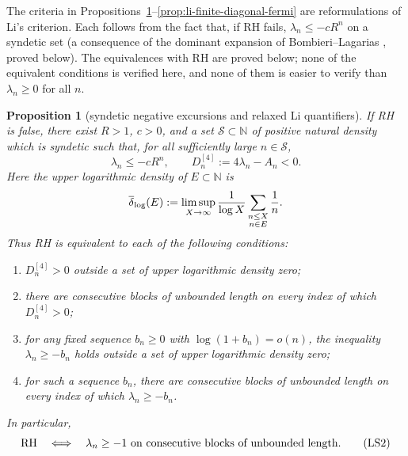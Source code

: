 \documentclass[11pt]{amsart}
\newtheorem{proposition}[theorem]{Proposition}
\theoremstyle{definition}
\theoremstyle{remark}
\theoremstyle{definition}
\newcommand{\RH}{\mathrm{RH}}
\begin{document}
The criteria in Propositions~\ref{prop:li-syndetic-density-criteria}--\ref{prop:li-finite-diagonal-fermi}
are reformulations of Li's criterion.  Each follows from the fact that, if
RH fails, $\lambda_n\le-cR^n$ on a syndetic set (a consequence of the
dominant expansion of Bombieri--Lagarias \cite{BombieriLagarias1999},
proved below).  The equivalences with RH are proved below; none of the
equivalent conditions is verified here, and none of them is easier to
verify than $\lambda_n\ge0$ for all $n$.

\begin{proposition}[syndetic negative excursions and relaxed Li quantifiers]
\label{prop:li-syndetic-density-criteria}
If RH is false, there exist $R>1$, $c>0$, and a set
$\mathcal S\subset\mathbb N$ of positive natural density which is syndetic
such that, for all sufficiently large $n\in\mathcal S$,
\[
 \lambda_n\le-cR^n,
 \qquad D_n^{[4]}:=4\lambda_n-A_n<0.                       \tag{LS1}
\]
Here the upper logarithmic density of $E\subset\mathbb N$ is
\[
 \overline\delta_{\log}(E):=\limsup_{X\to\infty}{1\over\log X}
      \sum_{\substack{n\le X\\n\in E}}{1\over n}.
\]
Thus RH is equivalent to each of the following conditions:
\begin{enumerate}
\item $D_n^{[4]}>0$ outside a set of upper logarithmic density zero;
\item there are consecutive blocks of unbounded length on every index of
      which $D_n^{[4]}>0$;
\item for any fixed sequence $b_n\ge0$ with
      $\log(1+b_n)=o(n)$, the inequality $\lambda_n\ge-b_n$ holds outside
      a set of upper logarithmic density zero;
\item for such a sequence $b_n$, there are consecutive blocks of unbounded
      length on every index of which $\lambda_n\ge-b_n$.
\end{enumerate}
In particular,
\[
 \RH\quad\Longleftrightarrow\quad
 \lambda_n\ge-1\ \hbox{on consecutive blocks of unbounded length}.       \tag{LS2}
\]
\end{proposition}
\end{document}
